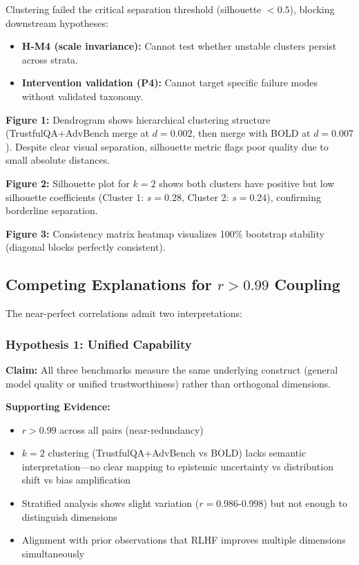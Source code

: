 Clustering failed the critical separation threshold (silhouette $< 0.5$), blocking downstream hypotheses:
\begin{itemize}
\item \textbf{H-M4 (scale invariance):} Cannot test whether unstable clusters persist across strata.
\item \textbf{Intervention validation (P4):} Cannot target specific failure modes without validated taxonomy.
\end{itemize}

\textbf{Figure 1:} Dendrogram shows hierarchical clustering structure (TrustfulQA+AdvBench merge at $d=0.002$, then merge with BOLD at $d=0.007$). Despite clear visual separation, silhouette metric flags poor quality due to small absolute distances.

\textbf{Figure 2:} Silhouette plot for $k=2$ shows both clusters have positive but low silhouette coefficients (Cluster 1: $s=0.28$, Cluster 2: $s=0.24$), confirming borderline separation.

\textbf{Figure 3:} Consistency matrix heatmap visualizes 100\% bootstrap stability (diagonal blocks perfectly consistent).

\subsection{Competing Explanations for $r > 0.99$ Coupling}

The near-perfect correlations admit two interpretations:

\subsubsection{Hypothesis 1: Unified Capability}

\textbf{Claim:} All three benchmarks measure the same underlying construct (general model quality or unified trustworthiness) rather than orthogonal dimensions.

\textbf{Supporting Evidence:}
\begin{itemize}
\item $r > 0.99$ across all pairs (near-redundancy)
\item $k=2$ clustering (TrustfulQA+AdvBench vs BOLD) lacks semantic interpretation---no clear mapping to epistemic uncertainty vs distribution shift vs bias amplification
\item Stratified analysis shows slight variation ($r=0.986$-0.998) but not enough to distinguish dimensions
\item Alignment with prior observations that RLHF improves multiple dimensions simultaneously
\end{itemize}

